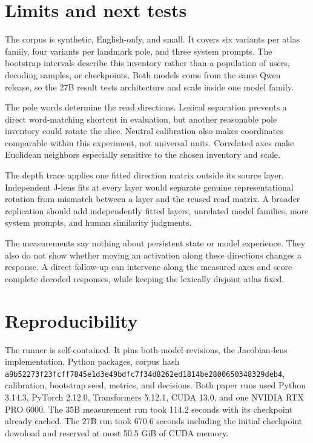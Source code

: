 \documentclass[10pt]{article}
\newcommand{\code}[1]{\texttt{#1}}
\begin{document}
\section{Limits and next tests}

The corpus is synthetic, English-only, and small. It covers six variants per
atlas family, four variants per landmark pole, and three system prompts. The
bootstrap intervals describe this inventory rather than a population of users,
decoding samples, or checkpoints. Both models come from the same Qwen release,
so the 27B result tests architecture and scale inside one model family.

The pole words determine the read directions. Lexical separation prevents a
direct word-matching shortcut in evaluation, but another reasonable pole
inventory could rotate the slice. Neutral calibration also makes coordinates
comparable within this experiment, not universal units. Correlated axes make
Euclidean neighbors especially sensitive to the chosen inventory and scale.

The depth trace applies one fitted direction matrix outside its source layer.
Independent J-lens fits at every layer would separate genuine representational
rotation from mismatch between a layer and the reused read matrix. A broader
replication should add independently fitted layers, unrelated model families,
more system prompts, and human similarity judgments.

The measurements say nothing about persistent state or model experience. They
also do not show whether moving an activation along these directions changes a
response. A direct follow-up can intervene along the measured axes and score
complete decoded responses, while keeping the lexically disjoint atlas fixed.

\section{Reproducibility}

The runner is self-contained. It pins both model revisions, the
Jacobian-lens implementation, Python packages, corpus hash
\code{a9b52273f23fcff7845e1d3e49bdfc7f34d8262ed1814be2800650348329deb4},
calibration, bootstrap seed, metrics, and decisions. Both paper runs used
Python 3.14.3, PyTorch 2.12.0, Transformers 5.12.1, CUDA 13.0, and one NVIDIA
RTX PRO 6000. The 35B measurement run took 114.2 seconds with its checkpoint
already cached. The 27B run took 670.6 seconds including the initial checkpoint
download and reserved at most 50.5 GiB of CUDA memory.
\end{document}
